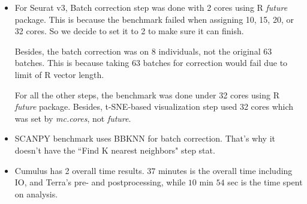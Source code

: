 \documentclass[10pt]{article}
\begin{document}
\begin{itemize}
	\item
	For Seurat v3, Batch correction step was done with 2 cores using R \textit{future} package. This is because the benchmark failed when assigning 10, 15, 20, or 32 cores. So we decide to set it to 2 to make sure it can finish.
	\par
	Besides, the batch correction was on 8 individuals, not the original 63 batches. This is because taking 63 batches for correction would fail due to limit of R vector length.
\par
For all the other steps, the benchmark was done under 32 cores using R \textit{future} package. Besides, t-SNE-based visualization step used 32 cores which was set by \textit{mc.cores}, not \textit{future}.

	\item
	SCANPY benchmark uses BBKNN for batch correction. That's why it doesn't have the ``Find K nearest neighbors" step stat.

	\item
	Cumulus has 2 overall time results. $37$ minutes is the overall time including IO, and Terra's pre- and postprocessing, while $10$ min $54$ sec is the time spent on analysis.
\end{itemize}
\paragraph{}
\end{document}
